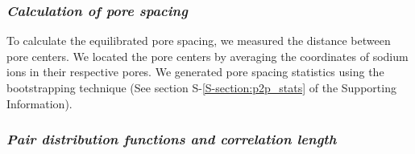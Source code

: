 \documentclass[journal=jpcbfk,manusciprt=article]{achemso}
\begin{document}
  \subsubsection{\textit{Calculation of pore spacing}}\label{method:pore_spacing}

  To calculate the equilibrated pore spacing, we measured the distance between
  pore centers. We located the pore centers by averaging the coordinates of sodium
  ions in their respective pores. We generated pore spacing statistics 
  using the bootstrapping technique (See section S-\ref{S-section:p2p_stats} of the
  Supporting Information).

%
  
  \subsubsection{\textit{Pair distribution functions and correlation length}}\label{section:correlation_length}
\end{document}
